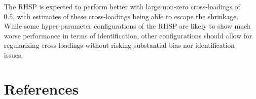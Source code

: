 \documentclass[
  english,
  man]{apa6}
\begin{document}
The RHSP is expected to perform better with large non-zero cross-loadings of 0.5, with estimates of these cross-loadings being able to escape the shrinkage. While some hyper-parameter configurations of the RHSP are likely to show much worse performance in terms of identification, other configurations should allow for regularizing cross-loadings without risking substantial bias nor identification issues.

\clearpage

\hypertarget{references}{%
\section{References}\label{references}}

~

\begingroup
\setlength{\parindent}{-0.5in}
\setlength{\leftskip}{0.5in}
\end{document}
